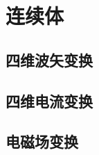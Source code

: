 

\section{连续体}\label{28-3}

\subsection{四维波矢变换}\label{28-3-1}

\subsection{四维电流变换}\label{28-3-2}

\subsection{电磁场变换}\label{28-3-3}
